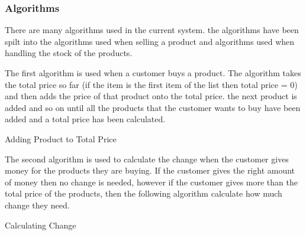 \subsubsection{Algorithms}

	\begin{flushleft}
There are many algorithms used in the current system. the algorithms have been spilt into the algorithms used when selling a product and algorithms used when handling the stock of the products.\par

 The first algorithm is used when a customer buys a product. The algorithm takes the total price so far (if the item is the first item of the list then total price = 0) and then adds the price of that  product onto the total price. the next product is added and so on until all the products that the customer wants to buy have been added and a total price has been calculated. \par

	\end{flushleft}

\begin{algorithm}[H]
\label{fig:repeat_pseudo_example}
	\caption{Adding Product to Total Price}
\begin{algorithmic}[1]
\EndIf
\EndWhile
\end{algorithmic}
\end{algorithm}


          \begin{flushleft}
The second algorithm is used to calculate the change when the customer gives money for the products they are buying. If the customer gives the right amount of money then no change is needed, however if the customer gives more than the total price of the products, then the following algorithm calculate how much change they need.
	\end{flushleft}	
	
\begin{algorithm}[H]
	\caption{Calculating Change}
\begin{algorithmic}[1]
\EndIf

\end{algorithmic}
\end{algorithm}																														
																										

